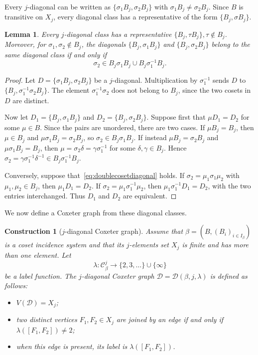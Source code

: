 \documentclass[11pt,letterpaper]{amsart}
\newtheorem{lemma}[prop]{Lemma}
\newtheorem{construction}[prop]{Construction}
\newcommand{\CC}{\mathcal{C}}
\begin{document}
Every $j$-diagonal can be written as $\{\sigma_1B_j,\sigma_2B_j\}$ with $\sigma_1B_j\neq\sigma_2B_j$. Since $B$ is transitive on $X_j$, every diagonal class has a representative of the form $\{B_j,\sigma B_j\}$.

\begin{lemma}\label{lem:double-cosets}
Every $j$-diagonal class has a representative
$\{B_j,\tau B_j\}, \tau\notin B_j$.
Moreover, for $\sigma_1,\sigma_2\notin B_j$, the diagonals $\{B_j,\sigma_1B_j\}$ and
$\{B_j,\sigma_2B_j\}$
belong to the same diagonal class if and only if
\begin{equation}\label{eq:doublecosetdiagonal}
\sigma_2\in B_j\sigma_1B_j\cup B_j\sigma_1^{-1}B_j.
\end{equation}
\end{lemma}

\begin{proof}
Let $D=\{\sigma_1B_j,\sigma_2B_j\}$ be a $j$-diagonal. Multiplication by $\sigma_1^{-1}$ sends $D$ to
$\{B_j,\sigma_1^{-1}\sigma_2B_j\}$.
The element $\sigma_1^{-1}\sigma_2$ does not belong to $B_j$, since the two cosets in $D$ are distinct.

Now let $
D_1=\{B_j,\sigma_1B_j\}$ and
$D_2=\{B_j,\sigma_2B_j\}$. Suppose first that $\mu D_1=D_2$ for some $ \mu\in B$. Since the pairs are unordered, there are two cases. If $\mu B_j=B_j$, then $\mu \in B_j$ and $ \mu \sigma_1B_j=\sigma_2B_j$, so $\sigma_2\in B_j\sigma_1B_j$. If instead $\mu B_j=\sigma_2B_j$ and $\mu \sigma_1B_j=B_j$, then $\mu=\sigma_2\delta=\gamma\sigma_1^{-1}$ for some $\delta,\gamma\in B_j$. Hence $\sigma_2=\gamma\sigma_1^{-1}\delta^{-1}\in B_j\sigma_1^{-1}B_j$.

Conversely, suppose that~\eqref{eq:doublecosetdiagonal} holds. If $\sigma_2=\mu_1\sigma_1\mu_2$ with $\mu_1,\mu_2\in B_j$, then $\mu_1D_1=D_2$. If $\sigma_2=\mu_1\sigma_1^{-1}\mu_2$, then $\mu_1\sigma_1^{-1}D_1=D_2$, with the two entries interchanged. Thus $D_1$ and $D_2$ are equivalent.
\end{proof}

We now define a Coxeter graph from these diagonal classes.

\begin{construction}[$j$-diagonal Coxeter graph]\label{const:graphFromCosetIncidence}
Assume that $\beta=(B,(B_i)_{i\in I_\beta})$ is a coset incidence system and that its $j$-elements set $X_j$ is finite and has more than one element. Let
\[
\lambda:\CC^j_\beta\longrightarrow \{2,3,\ldots\}\cup\{\infty\}
\]
be a label function. The \emph{$j$-diagonal Coxeter graph} $\mathcal{D}=\mathcal{D}(\beta,j,\lambda)$ is defined as follows:
\begin{itemize}
    \item $V(\mathcal{D})=X_j$;
    \item two distinct vertices $F_1,F_2\in X_j$ are joined by an edge if and only if $\lambda([F_1,F_2])\neq 2$;
    \item when this edge is present, its label is $\lambda([F_1,F_2])$.
\end{itemize}
\end{construction}
\end{document}

